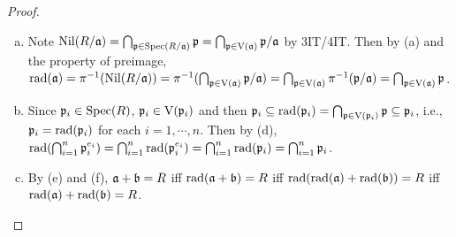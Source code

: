 \begin{proof}
\begin{enumerate}[(a)]
        \item
            Note $\operatorname{Nil}(R/\mathfrak{a}) = \bigcap_{\mathfrak{p} \in \operatorname{Spec}(R/\mathfrak{a})} \mathfrak{p} = \bigcap_{\mathfrak{p} \in \operatorname{V}(\mathfrak{a})} \mathfrak{p}/\mathfrak{a}$ by 3IT/4IT. Then by (a) and the property of preimage, $\operatorname{rad}(\mathfrak{a}) = \pi^{-1}(\operatorname{Nil}(R/\mathfrak{a}))  = \pi^{-1}(\bigcap_{\mathfrak{p} \in \operatorname{V}(\mathfrak{a})} \mathfrak{p}/\mathfrak{a}) = \bigcap_{\mathfrak{p} \in \operatorname{V}(\mathfrak{a})} \pi^{-1}(\mathfrak{p}/\mathfrak{a}) = \bigcap_{\mathfrak{p} \in \operatorname{V}(\mathfrak{a})} \mathfrak{p}$.
        \item Since $\mathfrak{p}_i \in \operatorname{Spec}(R)$, $\mathfrak{p}_i \in \operatorname{V}(\mathfrak{p}_i)$ and then $\mathfrak{p}_i \subseteq \operatorname{rad}(\mathfrak{p}_i) = \bigcap_{\mathfrak{p} \in \operatorname{V}(\mathfrak{p}_i)}\mathfrak{p} \subseteq \mathfrak{p}_i$, i.e., $\mathfrak{p}_i = \operatorname{rad}(\mathfrak{p}_i)$ for each $i = 1,\cdots,n$. Then by (d), $\operatorname{rad}(\bigcap_{i=1}^n \mathfrak{p}_i^{e_i}) = \bigcap_{i=1}^n \operatorname{rad}(\mathfrak{p}_i^{e_i}) = \bigcap_{i=1}^n \operatorname{rad}(\mathfrak{p}_i) = \bigcap_{i=1}^n \mathfrak{p}_i$. 
        \item
            By (e) and (f), $\mathfrak{a} + \mathfrak{b} = R$ iff $\operatorname{rad}(\mathfrak{a} + \mathfrak{b}) = R$ iff $\operatorname{rad}(\operatorname{rad}(\mathfrak{a}) + \operatorname{rad}(\mathfrak{b})) = R$ iff $\operatorname{rad}(\mathfrak{a}) + \operatorname{rad}(\mathfrak{b}) = R$. 
    \end{enumerate}
\end{proof}


